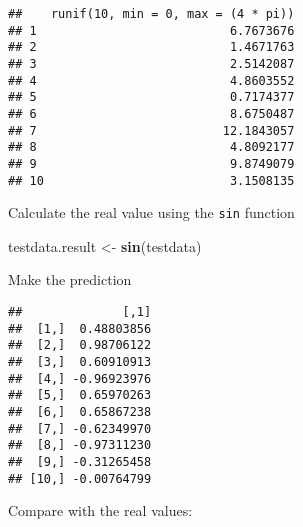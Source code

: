 \documentclass[]{article}
\newenvironment{Shaded}{\begin{snugshade}}{\end{snugshade}}
\newcommand{\KeywordTok}[1]{\textcolor[rgb]{0.13,0.29,0.53}{\textbf{#1}}}
\newcommand{\NormalTok}[1]{#1}
\newcommand{\OperatorTok}[1]{\textcolor[rgb]{0.81,0.36,0.00}{\textbf{#1}}}
\newcommand{\StringTok}[1]{\textcolor[rgb]{0.31,0.60,0.02}{#1}}
\begin{document}
\begin{verbatim}
##    runif(10, min = 0, max = (4 * pi))
## 1                           6.7673676
## 2                           1.4671763
## 3                           2.5142087
## 4                           4.8603552
## 5                           0.7174377
## 6                           8.6750487
## 7                          12.1843057
## 8                           4.8092177
## 9                           9.8749079
## 10                          3.1508135
\end{verbatim}

Calculate the real value using the \texttt{sin} function

\begin{Shaded}
\begin{Highlighting}[]
\NormalTok{testdata.result <-}\StringTok{ }\KeywordTok{sin}\NormalTok{(testdata)}
\end{Highlighting}
\end{Shaded}

Make the prediction

\begin{Shaded}
\end{Shaded}

\begin{verbatim}
##              [,1]
##  [1,]  0.48803856
##  [2,]  0.98706122
##  [3,]  0.60910913
##  [4,] -0.96923976
##  [5,]  0.65970263
##  [6,]  0.65867238
##  [7,] -0.62349970
##  [8,] -0.97311230
##  [9,] -0.31265458
## [10,] -0.00764799
\end{verbatim}

Compare with the real values:

\begin{Shaded}
\end{Shaded}
\end{document}
